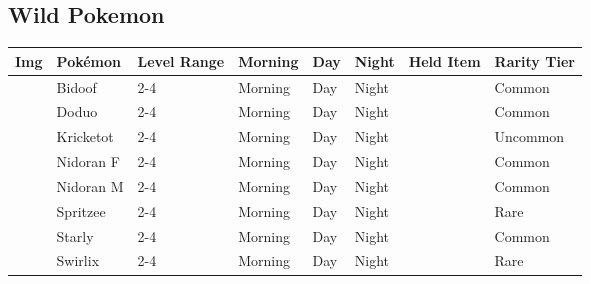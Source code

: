 \subsection{Wild Pokemon}%
\label{subsec:WildPokemon}%
\begin{longtable}{||l l l l l l l l||}%
\hline%
Img&Pokémon&Level Range&Morning&Day&Night&Held Item&Rarity Tier\\%
\hline%
\endhead%
\hline%
&Bidoof&2{-}4&Morning&Day&Night&&Common\\%
\hline%
&Doduo&2{-}4&Morning&Day&Night&&Common\\%
\hline%
&Kricketot&2{-}4&Morning&Day&Night&&Uncommon\\%
\hline%
&Nidoran F&2{-}4&Morning&Day&Night&&Common\\%
\hline%
&Nidoran M&2{-}4&Morning&Day&Night&&Common\\%
\hline%
&Spritzee&2{-}4&Morning&Day&Night&&Rare\\%
\hline%
&Starly&2{-}4&Morning&Day&Night&&Common\\%
\hline%
&Swirlix&2{-}4&Morning&Day&Night&&Rare\\%
\hline%
\end{longtable}